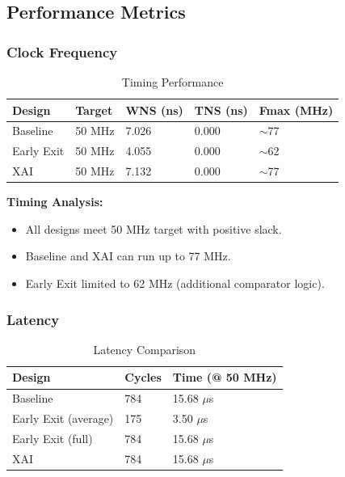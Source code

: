 \documentclass[11pt, a4paper]{article}
\begin{document}
\subsection{Performance Metrics}

\subsubsection{Clock Frequency}

\begin{table}[H]
\centering
\caption{Timing Performance}
\label{tab:timing}
\begin{tabular}{@{}lllll@{}}
\toprule
\textbf{Design} & \textbf{Target} & \textbf{WNS (ns)} & \textbf{TNS (ns)} & \textbf{Fmax (MHz)} \\ \midrule
Baseline & 50 MHz & 7.026 & 0.000 & $\sim$77 \\
Early Exit & 50 MHz & 4.055 & 0.000 & $\sim$62 \\
XAI & 50 MHz & 7.132 & 0.000 & $\sim$77 \\ \bottomrule
\end{tabular}
\end{table}

\textbf{Timing Analysis:}
\begin{itemize}
    \item All designs meet 50 MHz target with positive slack.
    \item Baseline and XAI can run up to 77 MHz.
    \item Early Exit limited to 62 MHz (additional comparator logic).
\end{itemize}

\subsubsection{Latency}

\begin{table}[H]
\centering
\caption{Latency Comparison}
\label{tab:latency}
\begin{tabular}{@{}lll@{}}
\toprule
\textbf{Design} & \textbf{Cycles} & \textbf{Time (@ 50 MHz)} \\ \midrule
Baseline & 784 & 15.68 $\mu$s \\
Early Exit (average) & 175 & 3.50 $\mu$s \\
Early Exit (full) & 784 & 15.68 $\mu$s \\
XAI & 784 & 15.68 $\mu$s \\ \bottomrule
\end{tabular}
\end{table}
\end{document}
